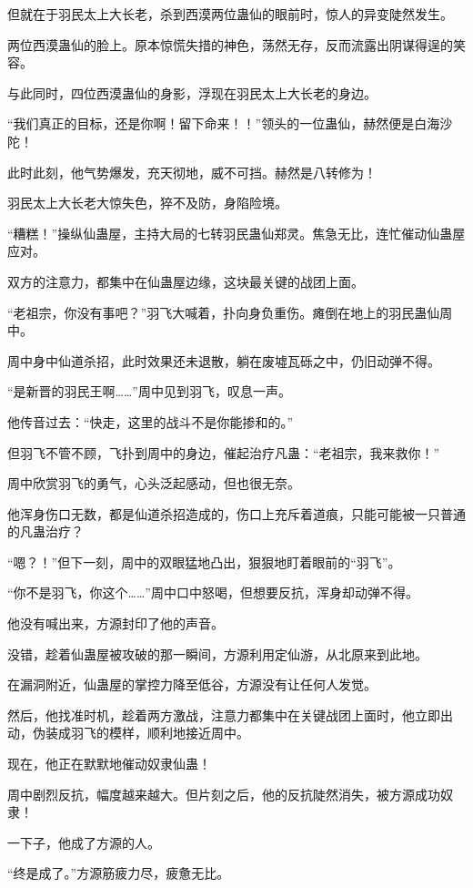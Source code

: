 \begin{this_body}
但就在于羽民太上大长老，杀到西漠两位蛊仙的眼前时，惊人的异变陡然发生。

两位西漠蛊仙的脸上。原本惊慌失措的神色，荡然无存，反而流露出阴谋得逞的笑容。

与此同时，四位西漠蛊仙的身影，浮现在羽民太上大长老的身边。

“我们真正的目标，还是你啊！留下命来！！”领头的一位蛊仙，赫然便是白海沙陀！

此时此刻，他气势爆发，充天彻地，威不可挡。赫然是八转修为！

羽民太上大长老大惊失色，猝不及防，身陷险境。

“糟糕！”操纵仙蛊屋，主持大局的七转羽民蛊仙郑灵。焦急无比，连忙催动仙蛊屋应对。

双方的注意力，都集中在仙蛊屋边缘，这块最关键的战团上面。

“老祖宗，你没有事吧？”羽飞大喊着，扑向身负重伤。瘫倒在地上的羽民蛊仙周中。

周中身中仙道杀招，此时效果还未退散，躺在废墟瓦砾之中，仍旧动弹不得。

“是新晋的羽民王啊……”周中见到羽飞，叹息一声。

他传音过去：“快走，这里的战斗不是你能掺和的。”

但羽飞不管不顾，飞扑到周中的身边，催起治疗凡蛊：“老祖宗，我来救你！”

周中欣赏羽飞的勇气，心头泛起感动，但也很无奈。

他浑身伤口无数，都是仙道杀招造成的，伤口上充斥着道痕，只能可能被一只普通的凡蛊治疗？

“嗯？！”但下一刻，周中的双眼猛地凸出，狠狠地盯着眼前的“羽飞”。

“你不是羽飞，你这个……”周中口中怒喝，但想要反抗，浑身却动弹不得。

他没有喊出来，方源封印了他的声音。

没错，趁着仙蛊屋被攻破的那一瞬间，方源利用定仙游，从北原来到此地。

在漏洞附近，仙蛊屋的掌控力降至低谷，方源没有让任何人发觉。

然后，他找准时机，趁着两方激战，注意力都集中在关键战团上面时，他立即出动，伪装成羽飞的模样，顺利地接近周中。

现在，他正在默默地催动奴隶仙蛊！

周中剧烈反抗，幅度越来越大。但片刻之后，他的反抗陡然消失，被方源成功奴隶！

一下子，他成了方源的人。

“终是成了。”方源筋疲力尽，疲惫无比。


\end{this_body}

